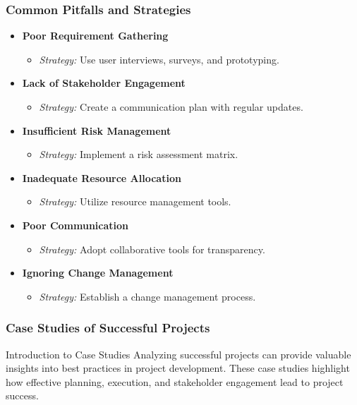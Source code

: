 \documentclass[aspectratio=169]{beamer}
\begin{document}
\begin{frame}[fragile]
    \frametitle{Common Pitfalls and Strategies}
    \begin{itemize}
        \item \textbf{Poor Requirement Gathering}
            \begin{itemize}
                \item \textit{Strategy:} Use user interviews, surveys, and prototyping.
            \end{itemize}
        \item \textbf{Lack of Stakeholder Engagement}
            \begin{itemize}
                \item \textit{Strategy:} Create a communication plan with regular updates.
            \end{itemize}
        \item \textbf{Insufficient Risk Management}
            \begin{itemize}
                \item \textit{Strategy:} Implement a risk assessment matrix.
            \end{itemize}
        \item \textbf{Inadequate Resource Allocation}
            \begin{itemize}
                \item \textit{Strategy:} Utilize resource management tools.
            \end{itemize}
        \item \textbf{Poor Communication}
            \begin{itemize}
                \item \textit{Strategy:} Adopt collaborative tools for transparency.
            \end{itemize}
        \item \textbf{Ignoring Change Management}
            \begin{itemize}
                \item \textit{Strategy:} Establish a change management process.
            \end{itemize}
    \end{itemize}
\end{frame}

\begin{frame}[fragile]
    \frametitle{Case Studies of Successful Projects}
    \begin{block}{Introduction to Case Studies}
        Analyzing successful projects can provide valuable insights into best practices in project development. These case studies highlight how effective planning, execution, and stakeholder engagement lead to project success.
    \end{block}
\end{frame}
\end{document}
